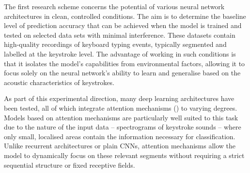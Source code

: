 \documentclass[a4paper,11pt,twoside]{report}
\theoremstyle{definition}
\begin{document}
The first research scheme concerns the potential of various neural network architectures in clean, controlled conditions. The aim is to determine the baseline level of prediction accuracy that can be achieved when the model is trained and tested on selected data sets with minimal interference. These datasets contain high-quality recordings of keyboard typing events, typically segmented and labelled at the keystroke level. The advantage of working in such conditions is that it isolates the model's capabilities from environmental factors, allowing it to focus solely on the neural network's ability to learn and generalise based on the acoustic characteristics of keystrokes.

As part of this experimental direction, many deep learning architectures have been tested, all of which integrate attention mechanisms (\cite{vaswani2017attention}) to varying degrees. Models based on attention mechanisms are particularly well suited to this task due to the nature of the input data – spectrograms of keystroke sounds – where only small, localised areas contain the information necessary for classification. Unlike recurrent architectures or plain CNNs, attention mechanisms allow the model to dynamically focus on these relevant segments without requiring a strict sequential structure or fixed receptive fields.

\end{document}
